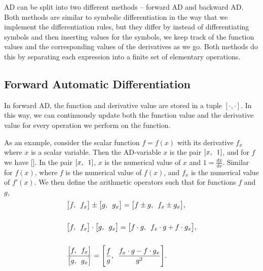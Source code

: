 AD can be split into two different methods -- forward AD and backward AD. Both methods are similar to symbolic differentiation in the way that we implement the differentiation rules, but they differ by instead of differentiating symbols and then inserting values for the symbols, we keep track of the function values and the corresponding values of the derivatives as we go. Both methods do this by separating each expression into a finite set of elementary operations. 

\subsection{Forward Automatic Differentiation}
In forward AD, the function and derivative value are stored in a tuple $[\cdot, \cdot]$. In this way, we can continuously update both the function value and the derivative value for every operation we perform on the function. 

As an example, consider the scalar function $f = f(x)$ with its derivative $f_x$ where $x$ is a scalar variable. Then the AD-variable $x$ is the pair $[x,\hspace{0.5em}1]$, and for $f$ we have []. In the pair $[x,\hspace{0.5em}1]$, $x$ is the numerical value of $x$ and $1 = \frac{dx}{dx}$. Similar for $f(x)$, where $f$ is the numerical value of $f(x)$, and $f_x$ is the numerical value of $f'(x)$.  We then define the arithmetic operators such that for functions $f$ and $g$,
\begin{equation}
    \begin{aligned}
    &\big[f,\hspace{0.5em}f_x\big] \pm \big[g,\hspace{0.5em}g_x   \big] = \big[f \pm g,\hspace{0.5em}f_x \pm g_x \big] ,\\\\
    &\big[  f,\hspace{0.5em}f_x   \big]\cdot \big[  g,\hspace{0.5em}g_x   \big] = \big[  f\cdot g,\hspace{0.5em}f_x\cdot g + f\cdot g_x   \big],\\\\
    &\frac{\big[ f,\hspace{0.5em}f_x   \big]}{\big[  g,\hspace{0.5em}g_x   \big]} = \Bigg[  \frac{f}{g},\hspace{0.5em}\frac{f_x\cdot g - f\cdot g_x}{g^2}\Bigg].
\end{aligned}
\label{eq:arithmeticOperators}
\end{equation}

